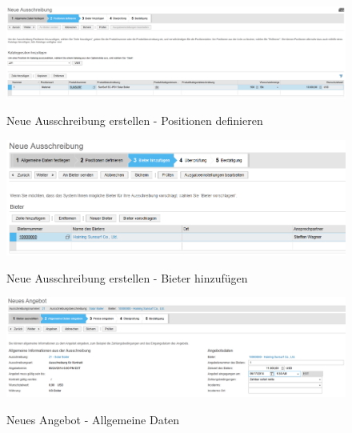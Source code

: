 \begin{figure}[H]
	\begin{center}
	\includegraphics[width=1.0\textwidth]{grafiken/ByDesign-HowTo-Ausschreibung-2.png}
	\caption{Neue Ausschreibung erstellen - Positionen definieren}
	\vspace{-10pt}
	\label{abb:byd-rfq-2}
	\end{center}
\end{figure}

\begin{figure}[H]
	\begin{center}
	\includegraphics[width=1.0\textwidth]{grafiken/ByDesign-HowTo-Ausschreibung-3.png}
	\caption{Neue Ausschreibung erstellen - Bieter hinzufügen}
	\vspace{-10pt}
	\label{abb:byd-rfq-3}
	\end{center}
\end{figure}

\begin{figure}[H]
	\begin{center}
	\includegraphics[width=1.0\textwidth]{grafiken/ByDesign-HowTo-Ausschreibung-4.png}
	\caption{Neues Angebot - Allgemeine Daten}
	\vspace{-10pt}
	\label{abb:byd-rfq-4}
	\end{center}
\end{figure}

